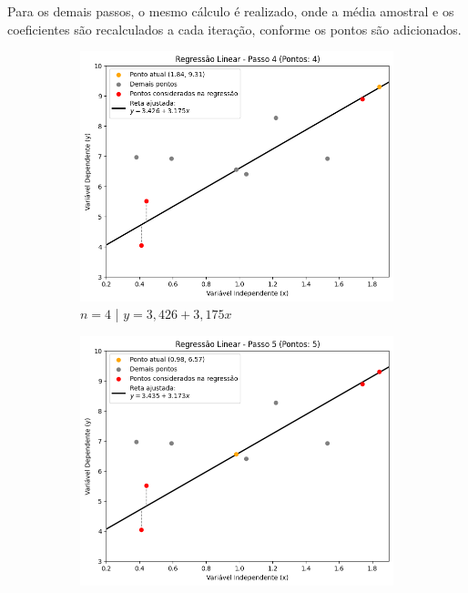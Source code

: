 Para os demais passos, o mesmo cálculo é realizado, onde a média amostral e os coeficientes são recalculados a cada iteração, conforme os pontos são adicionados.

\begin{figure}[H]
	\centering
	\caption{Iterações da aplicação do método MQO}
	\begin{subfigure}{0.4\textwidth}
	  \includegraphics[width=\linewidth]{figuras/RL_step_4.png}
	  \caption{$n = 4$ | $y = 3,426 + 3,175x$}
	  \label{fig:mqo_4}
	\end{subfigure}
	\hspace{0.5cm}
	\begin{subfigure}{0.4\textwidth} 
		\includegraphics[width=\linewidth]{figuras/RL_step_5.png}

\end{subfigure}
\end{figure}
